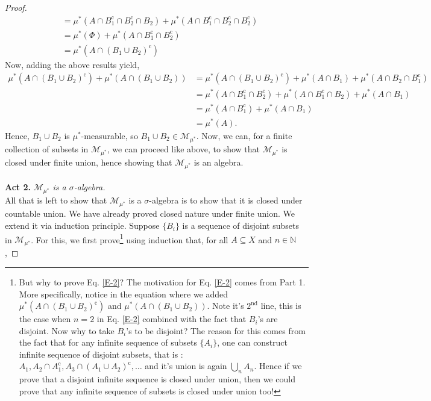 \documentclass{article}
\theoremstyle{definition}
\theoremstyle{remark}
\theoremstyle{definition}
\theoremstyle{definition}
\theoremstyle{definition}
\newcommand{\union}{\cup}
\newcommand{\intrs}{\cap}
\newcommand{\bunion}{\bigcup}
\newcommand{\N}{\mathbb{N}}
\newcommand{\comp}[1]{#1^{\text{c}}}
\newcommand{\om}[1]{\mu^*\left ( #1\right )}
\newcommand{\set}[1]{\mathscr{#1}}
\newcommand{\msigm}[1]{\set{M}_{#1}}
\begin{document}
\begin{proof}
\begin{equation*}
\begin{split}
		&= \om{A\intrs \comp{B_1} \intrs \comp{B_2}\intrs B_2} + \om{A\intrs \comp{B_1} \intrs \comp{B_2} \intrs \comp{B_2}}\\
		&= \om{\Phi} + \om{A\intrs \comp{B_1} \intrs \comp{B_2}}\\
		&= \om{A\intrs \comp{(B_1\union B_2)}}
	\end{split}
\end{equation*}
Now, adding the above results yield,
\begin{equation*}
	\begin{split}
		\om{A\intrs \comp{(B_1 \union B_2)}} + \om{A\intrs (B_1 \union B_2)} &= \om{A\intrs \comp{(B_1\union B_2)}} + \om{A\intrs B_1} + \om{A\intrs B_2 \intrs \comp{B_1}}\\
		&= \om{A\intrs \comp{B_1}\intrs \comp{B_2}} + \om{A\intrs \comp{B_1} \intrs B_2} + \om{A\intrs B_1}\\
		&= \om{A\intrs \comp{B_1}} + \om{A\intrs B_1}\\
		&= \om{A}.
	\end{split}
\end{equation*}
Hence, $ B_1\union B_2 $ is $ \mu^* $-measurable, so $ B_1\union B_2\in \msigm{\mu^*} $. Now, we can, for a finite collection of subsets in $ \msigm{\mu^*} $, we can proceed like above, to show that $ \msigm{\mu^*} $ is closed under finite union, hence showing that $ \msigm{\mu^*} $ is an algebra.\\\\
\textbf{Act 2.} \emph{$ \msigm{\mu^*} $ is a $ \sigma $-algebra.}\\
All that is left to show that $ \msigm{\mu^*} $ is a $ \sigma $-algebra is to show that it is closed under countable union. We have already proved closed nature under finite union. We extend it via induction principle. Suppose $ \{B_i\} $ is a sequence of disjoint subsets in $ \msigm{\mu^*} $. For this, we first prove\footnote{But why to prove Eq. \ref{E-2}? The motivation for Eq. \ref{E-2} comes from Part 1. More specifically, notice in the equation where we added $ \om{A\intrs \comp{(B_1 \union B_2)}} $ and $ \om{A\intrs (B_1 \union B_2)} $. Note it's $ 2^\text{nd} $ line, this is the case when $ n=2 $ in Eq. \ref{E-2} combined with the fact that $ B_i $'s are disjoint. Now why to take $ B_i $'s to be disjoint? The reason for this comes from the fact that for any infinite sequence of subsets $ \{A_i\} $, one can construct infinite sequence of disjoint subsets, that is : $ A_1, A_2 \intrs \comp{A_1}, A_3\intrs \comp{(A_1\union A_2)},\dots $ and it's union is again $ \bunion_n A_n $. Hence if we prove that a disjoint infinite sequence is closed under union, then we could prove that any infinite sequence of subsets is closed under union too!} using induction that, for all $ A\subseteq X $ and $ n\in \N $, 

\end{proof}
\end{document}
